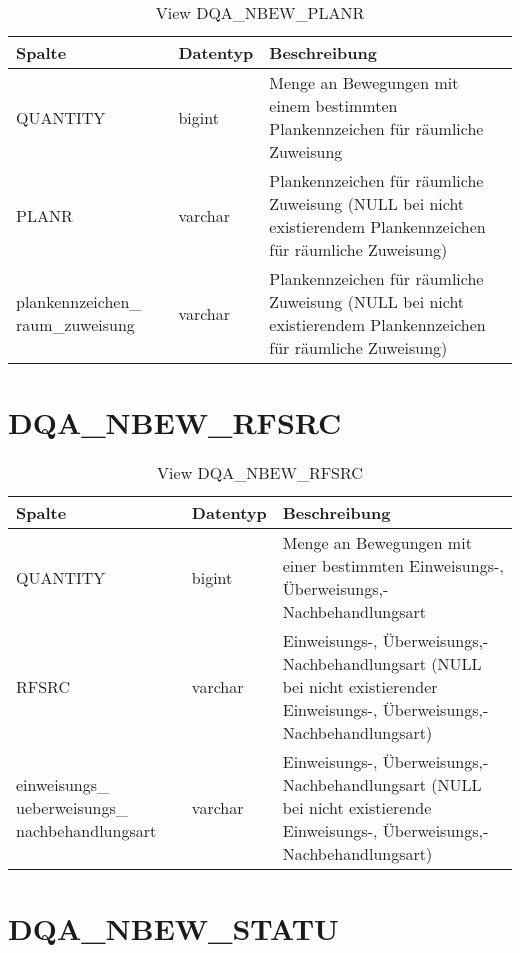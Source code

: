  \begin{table}[ht]
    \centering
    \caption{View DQA\_NBEW\_PLANR}
    \label{tab:dqanbewplanr}
    \begin{tabular}{||p{3cm}|l|p{10cm}||}
      \hline
      Spalte & Datentyp & Beschreibung \\ [0.5ex] \hline \hline
QUANTITY & bigint & Menge an Bewegungen mit einem bestimmten Plankennzeichen für räumliche Zuweisung \\ \hline
PLANR & varchar & Plankennzeichen für räumliche Zuweisung (NULL bei nicht existierendem Plankennzeichen für räumliche Zuweisung)\\ \hline
plankennzeichen\_ raum\_zuweisung & varchar & Plankennzeichen für räumliche Zuweisung (NULL bei nicht existierendem Plankennzeichen für räumliche Zuweisung)\\ \hline
    \end{tabular}
  \end{table}
 \clearpage
  \section{DQA\_NBEW\_RFSRC}

  \begin{table}[ht]
    \centering
    \caption{View DQA\_NBEW\_RFSRC}
    \label{tab:dqanbewrfsrc}
    \begin{tabular}{||p{3cm}|l|p{10cm}||}
      \hline
      Spalte & Datentyp & Beschreibung \\ [0.5ex] \hline \hline
QUANTITY & bigint & Menge an Bewegungen mit einer bestimmten Einweisungs-, Überweisungs,- Nachbehandlungsart \\ \hline
RFSRC & varchar & Einweisungs-, Überweisungs,- Nachbehandlungsart (NULL bei nicht existierender Einweisungs-, Überweisungs,- Nachbehandlungsart)\\ \hline
einweisungs\_ ueberweisungs\_ nachbehandlungsart & varchar & Einweisungs-, Überweisungs,- Nachbehandlungsart (NULL bei nicht existierende Einweisungs-, Überweisungs,- Nachbehandlungsart)\\ \hline
    \end{tabular}
  \end{table}

  \section{DQA\_NBEW\_STATU}

